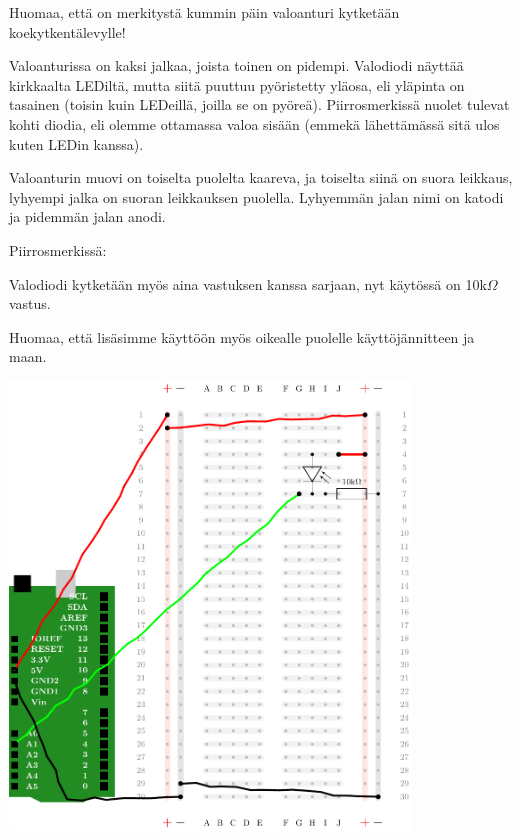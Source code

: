 \begin{tcolorbox}[title=Valoanturin kytkeminen,colback=blue!10,colbacktitle=purple!90]
Huomaa, että on merkitystä kummin päin valoanturi kytketään koekytkentälevylle! 

Valoanturissa on kaksi jalkaa, joista toinen on pidempi. Valodiodi näyttää kirkkaalta LEDiltä, mutta siitä puuttuu pyöristetty yläosa, eli yläpinta on tasainen (toisin kuin LEDeillä, joilla se on pyöreä). Piirrosmerkissä nuolet tulevat kohti diodia, eli olemme ottamassa valoa sisään (emmekä lähettämässä sitä ulos kuten LEDin kanssa). 

Valoanturin muovi on toiselta puolelta kaareva, ja toiselta siinä on suora leikkaus, lyhyempi jalka on suoran leikkauksen puolella. Lyhyemmän jalan nimi on katodi ja pidemmän jalan anodi.

Piirrosmerkissä:
\begin{center}
\end{center}

Valodiodi kytketään myös aina vastuksen kanssa sarjaan, nyt käytössä on 10k$\Omega$ vastus. 
\end{tcolorbox}

\clearpage
Huomaa, että lisäsimme käyttöön myös oikealle puolelle käyttöjännitteen ja maan.

\includegraphics[width=0.8\textwidth]{kuvat/kuva14.pdf}


